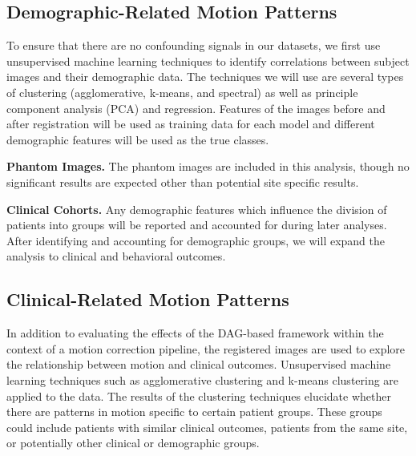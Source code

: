 \subsection{Demographic-Related Motion Patterns} %


To ensure that there are no confounding signals in our datasets, we first use unsupervised machine learning techniques to identify correlations between subject images and their demographic data. The techniques we will use are several types of clustering (agglomerative, k-means, and spectral) as well as principle component analysis (PCA) and regression. Features of the images before and after registration will be used as training data for each model and different demographic features will be used as the true classes. %

\textbf{Phantom Images.} The phantom images are included in this analysis, though no significant results are expected other than potential site specific results.

\textbf{Clinical Cohorts.} Any demographic features which influence the division of patients into groups will be reported and accounted for during later analyses. After identifying and accounting for demographic groups, we will expand the analysis to clinical and behavioral outcomes.


\subsection{Clinical-Related Motion Patterns} %

In addition to evaluating the effects of the DAG-based framework within the context of a motion correction pipeline, the registered images are used to explore the relationship between motion and clinical outcomes. Unsupervised machine learning techniques such as agglomerative clustering and k-means clustering are applied to the data. The results of the clustering techniques elucidate whether there are patterns in motion specific to certain patient groups. These groups could include patients with similar clinical outcomes, patients from the same site, or potentially other clinical or demographic groups.

